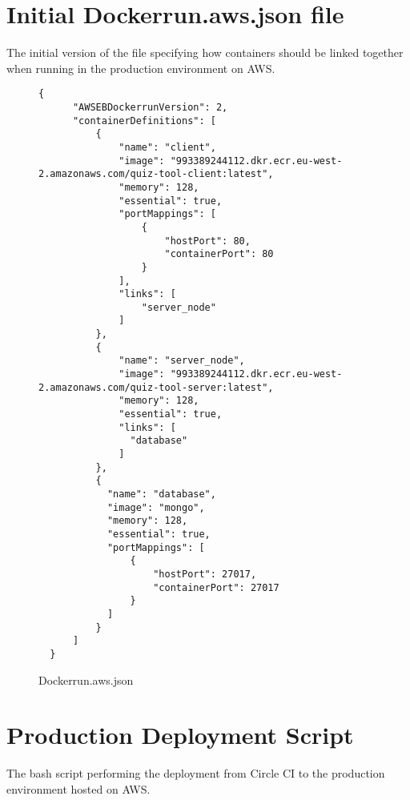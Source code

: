 \newpage
\section{Initial Dockerrun.aws.json file}
The initial version of the file specifying how containers should be linked together when running
in the production environment on AWS.

\begin{figure}[h!]
  \begin{lstlisting}[basicstyle=\small, breaklines=true]
  {
      "AWSEBDockerrunVersion": 2,
      "containerDefinitions": [
          {
              "name": "client",
              "image": "993389244112.dkr.ecr.eu-west-2.amazonaws.com/quiz-tool-client:latest",
              "memory": 128,
              "essential": true,
              "portMappings": [
                  {
                      "hostPort": 80,
                      "containerPort": 80
                  }
              ],
              "links": [
                  "server_node"
              ]
          },
          {
              "name": "server_node",
              "image": "993389244112.dkr.ecr.eu-west-2.amazonaws.com/quiz-tool-server:latest",
              "memory": 128,
              "essential": true,
              "links": [
                "database"
              ]
          },
          {
            "name": "database",
            "image": "mongo",
            "memory": 128,
            "essential": true,
            "portMappings": [
                {
                    "hostPort": 27017,
                    "containerPort": 27017
                }
            ]
          }
      ]
  }
  \end{lstlisting}
  \caption{Dockerrun.aws.json}
  \label{sample:dockerrunaws}
\end{figure}

\newpage
\section{Production Deployment Script}
The bash script performing the deployment from Circle CI to the production environment
hosted on AWS.

